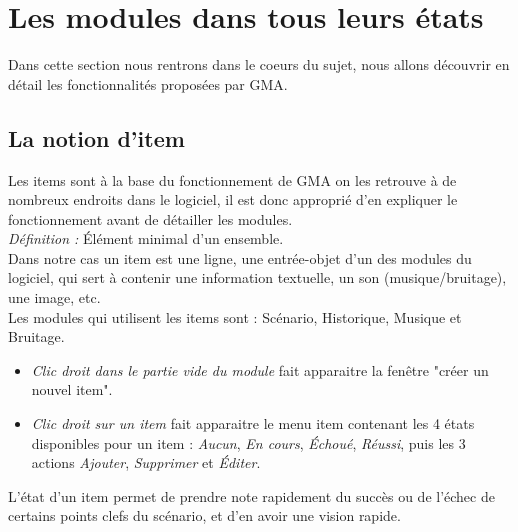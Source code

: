 \documentclass[a4paper,12pt]{article}
\begin{document}
\section{Les modules dans tous leurs états}\label{details}
Dans cette section nous rentrons dans le coeurs du sujet, nous allons découvrir en détail les fonctionnalités proposées par GMA.

\subsection{La notion d'item}\label{item}
Les items sont à la base du fonctionnement de GMA on les retrouve à de nombreux endroits dans le logiciel, il est donc approprié d'en expliquer le fonctionnement avant de détailler les modules.
\\
\emph{Définition : } Élément minimal d'un ensemble.
\\
Dans notre cas un item est une ligne, une entrée-objet d'un des modules du logiciel, qui sert à contenir une information textuelle, un son (musique/bruitage), une image, etc.
\\
Les modules qui utilisent les items sont : Scénario, Historique, Musique et Bruitage.

\begin{itemize}
    \item\emph{Clic droit dans le partie vide du module} fait apparaitre la fenêtre "créer un nouvel item".
    \item\emph{Clic droit sur un item} fait apparaitre le menu item contenant les 4 états disponibles pour un item : \emph{Aucun}, \emph{En cours}, \emph{Échoué}, \emph{Réussi}, puis les 3 actions \emph{Ajouter}, \emph{Supprimer} et \emph{Éditer}.
\end{itemize}
L'état d'un item permet de prendre note rapidement du succès ou de l'échec de certains points clefs du scénario, et d'en avoir une vision rapide.\\
\end{document}
